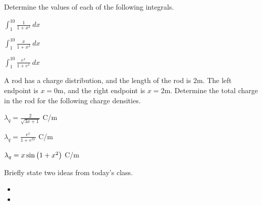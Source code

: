 
\begin{problem}
\item Determine the values of each of the following integrals.
  \begin{subproblem}
  \item $\int^{10}_1 \frac{1}{1+x^2} ~ dx$
    \vfill
  \item $\int^{10}_1 \frac{x}{1+x^2} ~ dx$
    \vfill
  \item $\int^{10}_1 \frac{e^x}{1+e^{x}} ~ dx$
    \vfill
  \end{subproblem}
\end{problem}


\begin{problem}
\item A rod has a charge distribution, and the length of the rod is
  2m. The left endpoint is $x=0$m, and the right endpoint is
  $x=2$m. Determine the total charge in the rod for the following
  charge densities. 
  \begin{subproblem}
    \item $\lambda_q = \frac{2}{\sqrt{3x+1}}$ C/m
      \vfill
    \item $\lambda_q = \frac{e^x}{1+e^{2x}}$ C/m
      \vfill
    \item $\lambda_q = x\sin\left( 1+x^2\right)$ C/m
      \vfill
  \end{subproblem}
\end{problem}


\postClass

\begin{problem}
\item Briefly state two ideas from today's class.
  \begin{itemize}
  \item 
  \item 
  \end{itemize}
\item 
  \begin{subproblem}
    \item
  \end{subproblem}
\end{problem}




